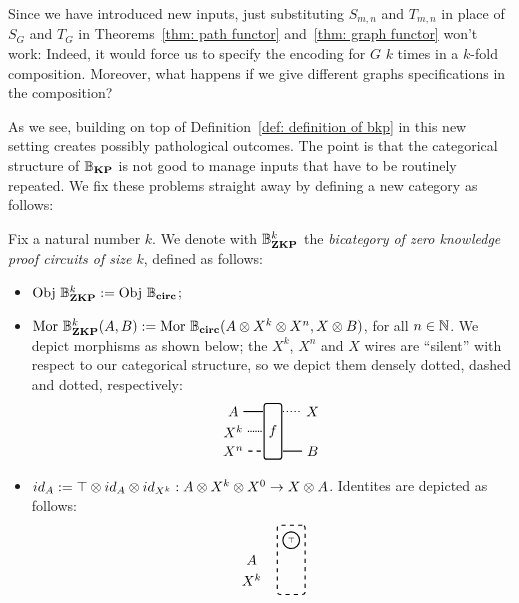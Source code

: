 \documentclass[preliminary,copyright,creativecommons,sharealike,noncommercial]{eptcs}
\begin{document}
Since we have introduced new inputs, just substituting $S_{m,n}$ 
and $T_{m,n}$ in place of $S_G$ and $T_G$ in 
Theorems~\ref{thm: path functor} and~\ref{thm: graph functor}
won't work: Indeed, it would force us to specify the encoding
for $G$ $k$ times in a $k$-fold composition. Moreover, what happens 
if we give different graphs specifications in the composition?

As we see, building on top of Definition~\ref{def: definition of bkp}
in this new setting creates possibly pathological outcomes. 
The point is that the categorical structure 
of $\mathbb{B}_\textbf{KP}$ is not good to manage inputs that have to be 
routinely repeated. We fix these problems straight away 
by defining a new category as follows:
%
%
\begin{definition}\label{def: definition of bzkp}
  Fix a natural number $k$. We denote with $\mathbb{B}^{k}_\textbf{ZKP}$ 
  the \emph{bicategory of zero knowledge proof circuits of size $k$}, defined 
  as follows:
  \begin{itemize}
    \item $\operatorname{Obj} \, \mathbb{B}^{k}_\textbf{ZKP} := \operatorname{Obj} \, \mathbb{B}_\textbf{circ}$;
    \item $\operatorname{Mor} \, \mathbb{B}^{k}_\textbf{ZKP}(A,B) := \operatorname{Mor} \, \mathbb{B}_\textbf{circ}(A \otimes X^k \otimes X^n, X \otimes B )$, for all $n \in \mathbb{N}$.
    We depict morphisms as shown below; the $X^k$, $X^n$ and $X$ wires are ``silent'' with respect to 
    our categorical structure, so we depict them densely dotted, dashed and dotted, respectively:
    \begin{equation*}
    \begin{tikzpicture}
      \node[draw, minimum height=40, minimum width=5, rounded corners=2, thick] (f) at (-1,0.5) {$f$};
      \node (A) at (-2,1) {$A$};
      \node (Xk0) at (-2,0.5) {$X^{k}$};
      \node (Xn0) at (-2,0) {$X^{n}$};

      \node (Bf) at (0,1) {$X$};
      \node (B) at (0,0) {$B$};

      \draw[thick] (A) -- (-1.25,1);
      \draw[densely dotted,thick] (Xk0) -- (-1.25,0.5);
      \draw[dashed,thick] (Xn0) -- (-1.25,0);

      \draw[dotted,thick] (-0.75,1) -- (Bf);
      \draw[thick] (-0.75,0) -- (B);
    \end{tikzpicture}  
    \end{equation*}
    \item $id_{A} := \top \otimes id_{A} \otimes id_{X^k}: A \otimes X^k \otimes X^0  \to X \otimes A$. Identites are
    depicted as follows:
    \begin{equation*}
    \begin{tikzpicture}
      \node[draw, dashed, minimum height=50, minimum width=20, rounded corners=2, thick] (f) at (-1,0.5) {};
      \node[thick, draw, circle, radius=2pt, inner sep = 2pt] (true) at (-1,1) {\tiny{$\top$}};
      \node (A) at (-2,0.5) {$A$};
      \node (Xk) at (-2,0) {$X^k$};


\end{tikzpicture}
\end{equation*}
\end{itemize}
\end{definition}
\end{document}
